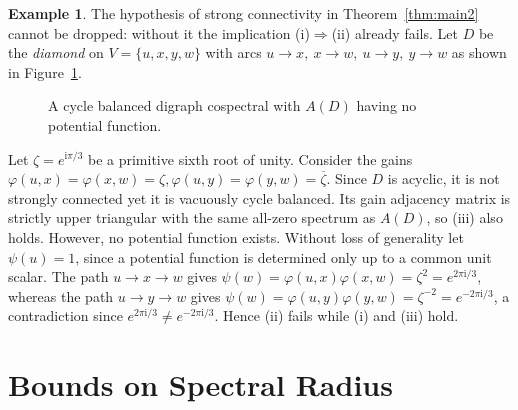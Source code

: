 \documentclass[12pt]{article}
\theoremstyle{definition}
\newtheorem{example}[theorem]{Example}
\newcommand{\vp}{\varphi}
\begin{document}
\begin{example}\label{ex:diamond}
The hypothesis of strong connectivity in Theorem~\ref{thm:main2} cannot be dropped: without it the implication \textnormal{(i)}$\Rightarrow$\textnormal{(ii)} already fails. Let $D$ be the \emph{diamond} on $V=\{u,x,y,w\}$ with arcs $u\to x,\ x\to w,\ u\to y,\ y\to w$ as shown in Figure~\ref{Fig 2}. 



\begin{figure}[ht]
\centering
{}
\caption{A cycle balanced digraph cospectral with $A(D)$ having no potential function.}
\label{Fig 2}
\end{figure}
Let $\zeta=e^{\mathrm{i}\pi/3}$ be a primitive sixth root of unity. Consider the gains
\(
\vp(u,x)=\vp(x,w)=\zeta, \vp(u,y)=\vp(y,w)=\overline{\zeta}.
\)
  Since $D$ is acyclic, it is not strongly connected yet it is vacuously cycle balanced. Its gain adjacency matrix is strictly upper triangular with the same all-zero spectrum as $A(D)$, so \textnormal{(iii)} also holds. However, no potential function exists. Without loss of generality let $\psi(u)=1$, since a potential function is determined only up to a common unit scalar. The path $u\to x\to w$ gives $\psi(w)=\vp(u,x)\vp(x,w)=\zeta^{2}=e^{2\pi \mathrm{i}/3}$, whereas the path $u\to y\to w$ gives $\psi(w)=\vp(u,y)\vp(y,w)=\zeta^{-2}=e^{-2\pi \mathrm{i}/3}$, a contradiction since $e^{2\pi \mathrm{i}/3}\neq e^{-2\pi \mathrm{i}/3}$.  Hence \textnormal{(ii)} fails while \textnormal{(i)} and \textnormal{(iii)} hold. 

\end{example}

\section{Bounds on Spectral Radius} \label{sec 3}
\end{document}
